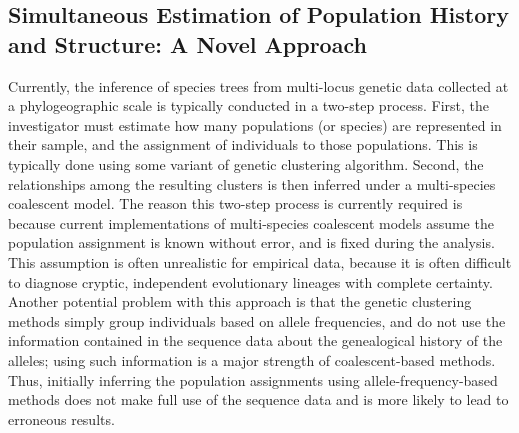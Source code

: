 \documentclass[10pt]{article}
\begin{document}
\subsection*{Simultaneous Estimation of Population History and Structure: A Novel Approach}
Currently, the inference of species trees from multi-locus genetic data collected at a phylogeographic scale is typically conducted in a two-step process.
First, the investigator must estimate how many populations (or species) are represented in their sample, and the assignment of individuals to those populations.
This is typically done using some variant of genetic clustering algorithm.
Second, the relationships among the resulting clusters is then inferred under a multi-species coalescent model.
The reason this two-step process is currently required is because current implementations of multi-species coalescent models assume the population assignment is known without error, and is fixed during the analysis.
This assumption is often unrealistic for empirical data, because it is often difficult to diagnose cryptic, independent evolutionary lineages with complete certainty.
Another potential problem with this approach is that the genetic clustering methods simply group individuals based on allele frequencies, and do not use the information contained in the sequence data about the genealogical history of the alleles; using such information is a major strength of coalescent-based methods.
Thus, initially inferring the population assignments using allele-frequency-based methods does not make full use of the sequence data and is more likely to lead to erroneous results.
\end{document}
